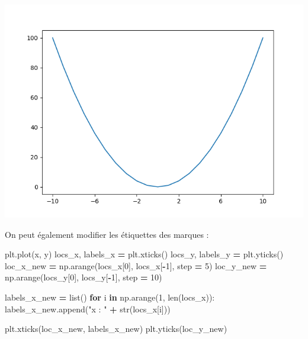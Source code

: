 \documentclass[12pt,]{book}
\newenvironment{Shaded}{\begin{snugshade}}{\end{snugshade}}
\newcommand{\KeywordTok}[1]{\textcolor[rgb]{0.13,0.29,0.53}{\textbf{#1}}}
\newcommand{\DecValTok}[1]{\textcolor[rgb]{0.00,0.00,0.81}{#1}}
\newcommand{\StringTok}[1]{\textcolor[rgb]{0.31,0.60,0.02}{#1}}
\newcommand{\ControlFlowTok}[1]{\textcolor[rgb]{0.13,0.29,0.53}{\textbf{#1}}}
\newcommand{\OperatorTok}[1]{\textcolor[rgb]{0.81,0.36,0.00}{\textbf{#1}}}
\newcommand{\BuiltInTok}[1]{#1}
\newcommand{\NormalTok}[1]{#1}
\numberwithin{equation}{section}
\numberwithin{countremarque}{section}
\begin{document}
\begin{center}\includegraphics[width=9.03in]{figs/pyplot/plot_ticks_2} \end{center}

On peut également modifier les étiquettes des marques :

\begin{Shaded}
\begin{Highlighting}[]
\NormalTok{plt.plot(x, y)}
\NormalTok{locs_x, labels_x }\OperatorTok{=}\NormalTok{ plt.xticks()}
\NormalTok{locs_y, labels_y }\OperatorTok{=}\NormalTok{ plt.yticks()}
\NormalTok{loc_x_new }\OperatorTok{=}\NormalTok{ np.arange(locs_x[}\DecValTok{0}\NormalTok{], locs_x[}\OperatorTok{-}\DecValTok{1}\NormalTok{], step }\OperatorTok{=} \DecValTok{5}\NormalTok{)}
\NormalTok{loc_y_new }\OperatorTok{=}\NormalTok{ np.arange(locs_y[}\DecValTok{0}\NormalTok{], locs_y[}\OperatorTok{-}\DecValTok{1}\NormalTok{], step }\OperatorTok{=} \DecValTok{10}\NormalTok{)}

\NormalTok{labels_x_new }\OperatorTok{=} \BuiltInTok{list}\NormalTok{()}
\ControlFlowTok{for}\NormalTok{ i }\KeywordTok{in}\NormalTok{ np.arange(}\DecValTok{1}\NormalTok{, }\BuiltInTok{len}\NormalTok{(locs_x)):}
\NormalTok{        labels_x_new.append(}\StringTok{"x : "} \OperatorTok{+} \BuiltInTok{str}\NormalTok{(locs_x[i]))}

\NormalTok{plt.xticks(loc_x_new, labels_x_new)}
\NormalTok{plt.yticks(loc_y_new)}
\end{Highlighting}
\end{Shaded}
\end{document}
